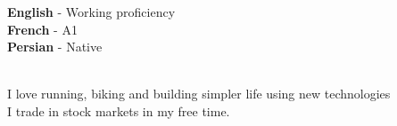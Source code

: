 \documentclass[9pt]{developercv}
\begin{document}





\begin{minipage}[t]{0.45\textwidth}
	\vspace{-\baselineskip} %


	\textbf{English} - Working proficiency\\
	\textbf{French} - A1\\
	\textbf{Persian} - Native\\\
\end{minipage}
\hfill
\begin{minipage}[t]{0.45\textwidth}
	\vspace{-\baselineskip} %


	I love running, biking and building simpler life using new technologies\\
	I trade in stock markets in my free time.
\end{minipage}
\end{document}
